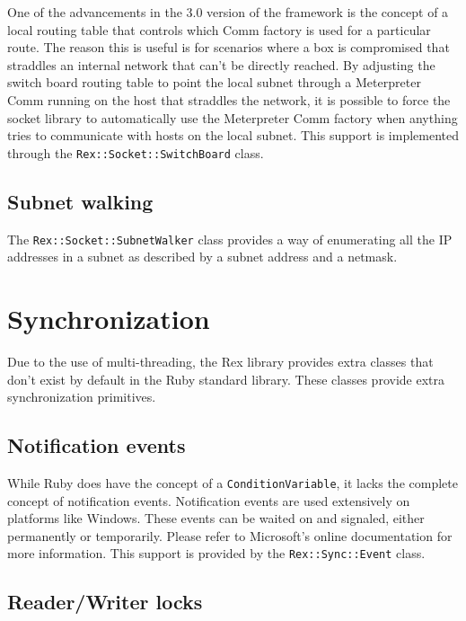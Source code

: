 \documentclass{report}
\begin{document}
\par
One of the advancements in the 3.0 version of the framework is the
concept of a local routing table that controls which Comm factory is
used for a particular route.  The reason this is useful is for
scenarios where a box is compromised that straddles an internal
network that can't be directly reached.  By adjusting the switch
board routing table to point the local subnet through a Meterpreter
Comm running on the host that straddles the network, it is possible
to force the socket library to automatically use the Meterpreter
Comm factory when anything tries to communicate with hosts on the
local subnet.  This support is implemented through the
\texttt{Rex::Socket::SwitchBoard} class.

        \subsection{Subnet walking}

\par
The \texttt{Rex::Socket::SubnetWalker} class provides a way of
enumerating all the IP addresses in a subnet as described by a
subnet address and a netmask.

    \section{Synchronization}

\par
Due to the use of multi-threading, the Rex library provides extra
classes that don't exist by default in the Ruby standard library.
These classes provide extra synchronization primitives.

        \subsection{Notification events}

\par
While Ruby does have the concept of a \texttt{ConditionVariable}, it
lacks the complete concept of notification events.  Notification
events are used extensively on platforms like Windows.  These events
can be waited on and signaled, either permanently or temporarily.
Please refer to Microsoft's online documentation for more
information. This support is provided by the
\texttt{Rex::Sync::Event} class.

        \subsection{Reader/Writer locks}
\end{document}
